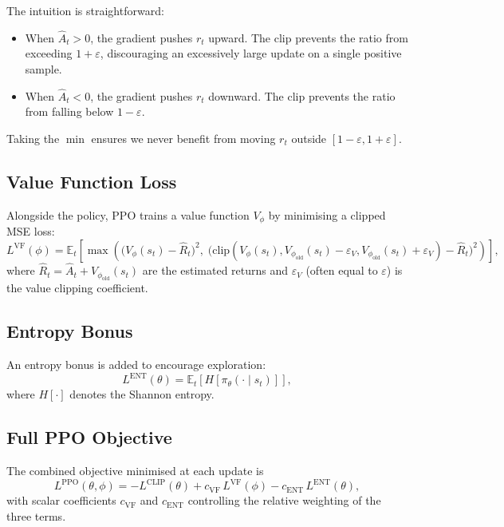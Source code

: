 \documentclass[12pt, a4paper]{article}
\theoremstyle{definition}
\theoremstyle{plain}
\theoremstyle{remark}
\newcommand{\E}{\mathbb{E}}
\newcommand{\pith}{\pi_\theta}
\newcommand{\clip}{\mathrm{clip}}
\begin{document}
The intuition is straightforward:
\begin{itemize}
  \item When $\hat{A}_t > 0$, the gradient pushes $r_t$ upward.  The clip prevents the
        ratio from exceeding $1 + \varepsilon$, discouraging an excessively large update
        on a single positive sample.
  \item When $\hat{A}_t < 0$, the gradient pushes $r_t$ downward.  The clip prevents the
        ratio from falling below $1 - \varepsilon$.
\end{itemize}
Taking the $\min$ ensures we never benefit from moving $r_t$ outside $[1-\varepsilon,
1+\varepsilon]$.

\subsection{Value Function Loss}

Alongside the policy, PPO trains a value function $V_\phi$ by minimising a clipped MSE
loss:
\begin{equation}
  L^{\mathrm{VF}}(\phi)
    = \E_t\!\left[
        \max\!\left(
          \bigl(V_\phi(s_t) - \hat{R}_t\bigr)^2,\;
          \bigl(\clip(V_\phi(s_t), V_{\phi_\mathrm{old}}(s_t) - \varepsilon_V,
                                   V_{\phi_\mathrm{old}}(s_t) + \varepsilon_V)
            - \hat{R}_t\bigr)^2
        \right)
      \right],
\end{equation}
where $\hat{R}_t = \hat{A}_t + V_{\phi_\mathrm{old}}(s_t)$ are the estimated returns and
$\varepsilon_V$ (often equal to $\varepsilon$) is the value clipping coefficient.

\subsection{Entropy Bonus}

An entropy bonus is added to encourage exploration:
\begin{equation}
  L^{\mathrm{ENT}}(\theta) = \E_t\!\left[H\!\left[\pith(\cdot \mid s_t)\right]\right],
\end{equation}
where $H[\cdot]$ denotes the Shannon entropy.

\subsection{Full PPO Objective}

The combined objective minimised at each update is
\begin{equation}
  \boxed{
    L^{\mathrm{PPO}}(\theta, \phi)
      = -L^{\mathrm{CLIP}}(\theta)
        + c_\mathrm{VF}\, L^{\mathrm{VF}}(\phi)
        - c_\mathrm{ENT}\, L^{\mathrm{ENT}}(\theta),
  }
  \label{eq:ppo_full}
\end{equation}
with scalar coefficients $c_\mathrm{VF}$ and $c_\mathrm{ENT}$ controlling the relative
weighting of the three terms.
\end{document}
